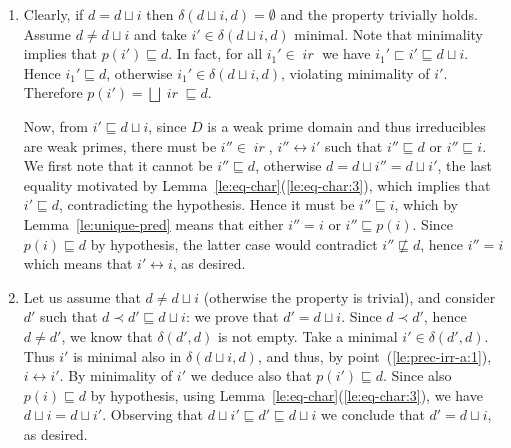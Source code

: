 \documentclass[conference]{IEEEtran}
\renewenvironment{proof}{\begin{IEEEproof}}{\end{IEEEproof}}
\newcommand{\ir}[1]{\ensuremath{\mathop{\mathit{ir}({#1})}}}
\newcommand{\diff}[2]{\ensuremath{\delta({#1},{#2})}}
\newcommand{\pred}[1]{\ensuremath{\mathit{p}({#1})}}
\begin{document}
\begin{proof}
  \begin{enumerate}
  \item Clearly, if $d = d \sqcup i$ {then $\diff{d \sqcup i}{d} = \emptyset$ and 
   the property trivially
    holds.} Assume $d \neq d \sqcup i$ and take
    $i' \in \diff{d \sqcup i}{d}$ minimal. Note that minimality
    implies that $\pred{i'} \sqsubseteq d$. In fact, for all
    {$i_1' \in \ir{\pred{i'}}$} we have
    $i_1' \sqsubset i' \sqsubseteq d \sqcup i$. Hence
    $i_1' \sqsubseteq d$, otherwise ${i_1'} \in \diff{d \sqcup i}{d}$,
    violating minimality of $i'$. Therefore
    $\pred{i'} = \bigsqcup \ir{\pred{i'}} \sqsubseteq d$.

    Now, from $i' \sqsubseteq d \sqcup i$, since $D$ is a weak prime
    domain and thus irreducibles are weak primes, there must be
    $i'' \in \ir{D}$, $i'' \leftrightarrow i'$ such that
    $i'' \sqsubseteq d$ or $i'' \sqsubseteq i$. We first note that it
    cannot be $i'' \sqsubseteq d$, otherwise
    $d = d \sqcup i'' = d \sqcup i'$, the last equality motivated by
    Lemma~\ref{le:eq-char}(\ref{le:eq-char:3}), {which implies that 
    $i' \sqsubseteq d$,} contradicting the hypothesis. 
    {Hence it must be $i'' \sqsubseteq i$, 
    which by Lemma~\ref{le:unique-pred} means that either $i'' = i$ or $i'' \sqsubseteq \pred{i}$. Since $\pred{i} \sqsubseteq d$ by hypothesis, the latter 
    case would contradict $i'' \not \sqsubseteq d$, hence $i'' = i$ which means
    that $i' \leftrightarrow i$, as desired.}
    

  \item {Let us assume  that $d \not = d \sqcup i$ (otherwise the property is trivial), and} consider $d'$ such that $d \prec d' \sqsubseteq d \sqcup i$:
   we prove that $d' = d \sqcup i$. Since $d \prec d'$, hence
    $d \neq d'$, we know that $\diff{d'}{d}$ is not empty. Take a
    minimal $i' \in \diff{d'}{d}$. Thus $i'$ is minimal also in
    $\diff{d \sqcup i}{d}$, and thus, by point~(\ref{le:prec-irr-a:1}),
    $i \leftrightarrow i'$. By minimality of $i'$ we deduce also that
    $\pred{i'} \sqsubseteq d$. Since also $\pred{i} \sqsubseteq d$ by
    hypothesis, using Lemma~\ref{le:eq-char}(\ref{le:eq-char:3}), we have
    $d \sqcup i = d \sqcup i'$.  Observing that
    $d \sqcup i' \sqsubseteq d' \sqsubseteq d \sqcup i$ we conclude
    that $d' = d \sqcup i$, as desired.
  \end{enumerate}
  
\end{proof}
\end{document}
